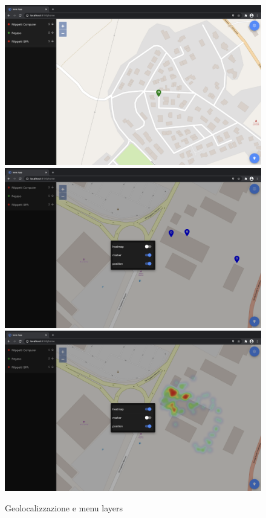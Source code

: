 \documentclass[a4paper]{report}
\begin{document}
\begin{figure}[tbp]
    \centering
    \includegraphics[width=.7\textwidth]{figure/ionicreact_3iterazione_geolocalizzazione.png}\hfill
    \includegraphics[width=.49\textwidth]{figure/ionicreact_3iterazione_menu1.png}\hfill
    \includegraphics[width=.49\textwidth]{figure/ionicreact_3iterazione_menu2.png}
    \caption{Geolocalizzazione e menu layers}
    \label{IonicReact_3iterazione}
\end{figure}

\printbibliography
\end{document}
